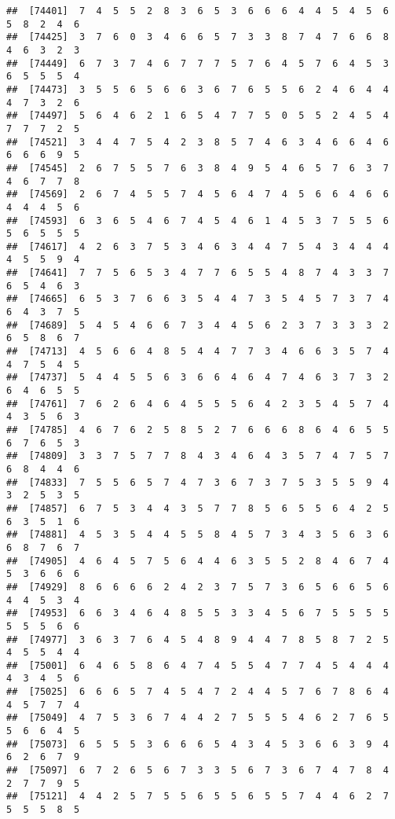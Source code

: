 \documentclass[
]{book}
\begin{document}
\begin{verbatim}
##  [74401]  7  4  5  5  2  8  3  6  5  3  6  6  6  4  4  5  4  5  6  5  8  2  4  6
##  [74425]  3  7  6  0  3  4  6  6  5  7  3  3  8  7  4  7  6  6  8  4  6  3  2  3
##  [74449]  6  7  3  7  4  6  7  7  7  5  7  6  4  5  7  6  4  5  3  6  5  5  5  4
##  [74473]  3  5  5  6  5  6  6  3  6  7  6  5  5  6  2  4  6  4  4  4  7  3  2  6
##  [74497]  5  6  4  6  2  1  6  5  4  7  7  5  0  5  5  2  4  5  4  7  7  7  2  5
##  [74521]  3  4  4  7  5  4  2  3  8  5  7  4  6  3  4  6  6  4  6  6  6  6  9  5
##  [74545]  2  6  7  5  5  7  6  3  8  4  9  5  4  6  5  7  6  3  7  4  6  7  7  8
##  [74569]  2  6  7  4  5  5  7  4  5  6  4  7  4  5  6  6  4  6  6  4  4  4  5  6
##  [74593]  6  3  6  5  4  6  7  4  5  4  6  1  4  5  3  7  5  5  6  5  6  5  5  5
##  [74617]  4  2  6  3  7  5  3  4  6  3  4  4  7  5  4  3  4  4  4  4  5  5  9  4
##  [74641]  7  7  5  6  5  3  4  7  7  6  5  5  4  8  7  4  3  3  7  6  5  4  6  3
##  [74665]  6  5  3  7  6  6  3  5  4  4  7  3  5  4  5  7  3  7  4  6  4  3  7  5
##  [74689]  5  4  5  4  6  6  7  3  4  4  5  6  2  3  7  3  3  3  2  6  5  8  6  7
##  [74713]  4  5  6  6  4  8  5  4  4  7  7  3  4  6  6  3  5  7  4  4  7  5  4  5
##  [74737]  5  4  4  5  5  6  3  6  6  4  6  4  7  4  6  3  7  3  2  6  4  6  5  5
##  [74761]  7  6  2  6  4  6  4  5  5  5  6  4  2  3  5  4  5  7  4  4  3  5  6  3
##  [74785]  4  6  7  6  2  5  8  5  2  7  6  6  6  8  6  4  6  5  5  6  7  6  5  3
##  [74809]  3  3  7  5  7  7  8  4  3  4  6  4  3  5  7  4  7  5  7  6  8  4  4  6
##  [74833]  7  5  5  6  5  7  4  7  3  6  7  3  7  5  3  5  5  9  4  3  2  5  3  5
##  [74857]  6  7  5  3  4  4  3  5  7  7  8  5  6  5  5  6  4  2  5  6  3  5  1  6
##  [74881]  4  5  3  5  4  4  5  5  8  4  5  7  3  4  3  5  6  3  6  6  8  7  6  7
##  [74905]  4  6  4  5  7  5  6  4  4  6  3  5  5  2  8  4  6  7  4  5  3  6  6  6
##  [74929]  8  6  6  6  6  2  4  2  3  7  5  7  3  6  5  6  6  5  6  4  4  5  3  4
##  [74953]  6  6  3  4  6  4  8  5  5  3  3  4  5  6  7  5  5  5  5  5  5  5  6  6
##  [74977]  3  6  3  7  6  4  5  4  8  9  4  4  7  8  5  8  7  2  5  4  5  5  4  4
##  [75001]  6  4  6  5  8  6  4  7  4  5  5  4  7  7  4  5  4  4  4  4  3  4  5  6
##  [75025]  6  6  6  5  7  4  5  4  7  2  4  4  5  7  6  7  8  6  4  4  5  7  7  4
##  [75049]  4  7  5  3  6  7  4  4  2  7  5  5  5  4  6  2  7  6  5  5  6  6  4  5
##  [75073]  6  5  5  5  3  6  6  6  5  4  3  4  5  3  6  6  3  9  4  6  2  6  7  9
##  [75097]  6  7  2  6  5  6  7  3  3  5  6  7  3  6  7  4  7  8  4  2  7  7  9  5
##  [75121]  4  4  2  5  7  5  5  6  5  5  6  5  5  7  4  4  6  2  7  5  5  5  8  5

\end{verbatim}
\end{document}

